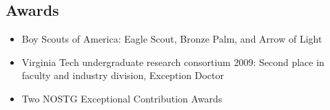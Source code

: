 \documentclass[line,margin]{res}
\begin{document}
\begin{resume}
\section{Awards}
\begin{itemize}  
\itemsep -2pt %
\setlength{\itemindent}{-1.5em} %
\item Boy Scouts of America: Eagle Scout, Bronze Palm, and Arrow of Light
\item Virginia Tech undergraduate research consortium 2009:  Second place in faculty and industry division, Exception Doctor
\item Two NOSTG Exceptional Contribution Awards
\end{itemize}
\end{resume}
\end{document}
